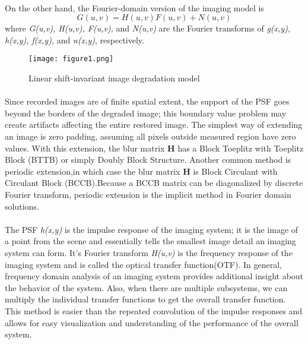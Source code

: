 \documentclass[a4paper]{book}
\begin{document}
	\paragraph*{} On the other hand, the Fourier-domain version of the imaging model is
	\begin{equation}
	\label{eq3.3}
	G(u,v) = H(u,v)F(u,v) + N(u,v)
	\end{equation}
	where \textit{G(u,v), H(u,v), F(u,v),} and \textit{N(u,v)} are the Fourier transforms of \textit{g(x,y), h(x,y), f(x,y),} and \textit{n(x,y)}, respectively.
%
	\begin{figure}[h]
	\begin{center}
		\texttt{[image: figure1.png]}
		\caption{\small Linear shift-invariant image degradation model}
		\label{fig:1}
	\end{center}
	\end{figure}


	\paragraph*{}Since recorded images are of finite spatial extent, the support of the PSF goes beyond the borders of the degraded image; this boundary value problem may create artifacts affecting the entire restored image\cite{Woods85boundary}. The simplest way of extending an image is zero padding, assuming all pixels outside measured region have zero values. With this extension, the blur matrix \textbf{H} has a Block Toeplitz with Toeplitz Block (BTTB) or simply Doubly Block Structure.\cite{Ng99afast} Another common method is periodic extension,in which case the blur matrix \textbf{H} is Block Circulant with Circulant Block (BCCB).Because a BCCB matrix can be diagonalized by discrete Fourier transform, periodic extension is the implicit method in Fourier domain solutions.


	\paragraph*{}The PSF \textit{h(x,y)} is the impulse response of the imaging system; it is the image of a point from the scene and essentially tells the smallest image detail an imaging system can form. It's Fourier transform \textit{H(u,v)} is the frequency response of the imaging system and is called the optical transfer function(OTF). In general, frequency domain analysis of an imaging system provides additional insight about the behavior of the system. Also, when there are multiple subsystems, we can multiply the individual transfer functions to get the overall transfer function. This method is easier than the repeated convolution of the impulse responses and allows for easy visualization and understanding of the performance of the overall system.
	
\end{document}
